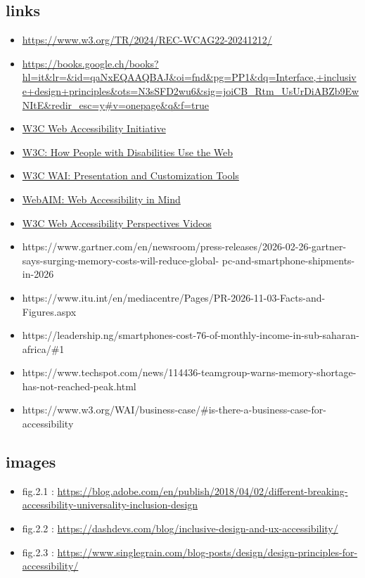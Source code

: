 \documentclass[11pt,a4paper]{article}
\begin{document}
	\subsection{links}
	
	\begin{itemize}
	\item  \url{https://www.w3.org/TR/2024/REC-WCAG22-20241212/} 		%
	\item 
	  \url{https://books.google.ch/books?hl=it&lr=&id=qaNxEQAAQBAJ&oi=fnd&pg=PP1&dq=Interface,+inclusive+design+principles&ots=N3sSFD2wu6&sig=joiCB_Rtm_UsUrDiABZb9EwNItE&redir_esc=y#v=onepage&q&f=true}	%
	   \item  \href{https://www.w3.org/WAI/}{W3C Web Accessibility Initiative}	%
   	 \item  \href{https://www.w3.org/WAI/people-use-web/}{W3C: How People with Disabilities Use the Web}	%
    	\item  \href{https://www.w3.org/WAI/people-use-web/tools-techniques/presentation/}{W3C WAI: Presentation and Customization Tools}	%
    	\item  \href{https://webaim.org/}{WebAIM: Web Accessibility in Mind}		%
    	\item  \href{https://www.w3.org/WAI/perspective-videos/}{W3C Web Accessibility Perspectives Videos}	%
	\item https://www.gartner.com/en/newsroom/press-releases/2026-02-26-gartner-says-surging-memory-costs-will-reduce-global-	pc-and-smartphone-shipments-in-2026
	\item https://www.itu.int/en/mediacentre/Pages/PR-2026-11-03-Facts-and-Figures.aspx
	\item https://leadership.ng/smartphones-cost-76-of-monthly-income-in-sub-saharan-africa/\#1
	\item https://www.techspot.com/news/114436-teamgroup-warns-memory-shortage-has-not-reached-peak.html
	\item https://www.w3.org/WAI/business-case/\#is-there-a-business-case-for-accessibility %
	\end{itemize}

	\subsection{images}

	\begin{itemize}
    	\item fig.2.1 :  \url {https://blog.adobe.com/en/publish/2018/04/02/different-breaking-accessibility-universality-inclusion-design}
	\item fig.2.2 :  \url{ https://dashdevs.com/blog/inclusive-design-and-ux-accessibility/}
	\item fig.2.3 :  \url{ https://www.singlegrain.com/blog-posts/design/design-principles-for-accessibility/}
	\end{itemize}
\end{document}
